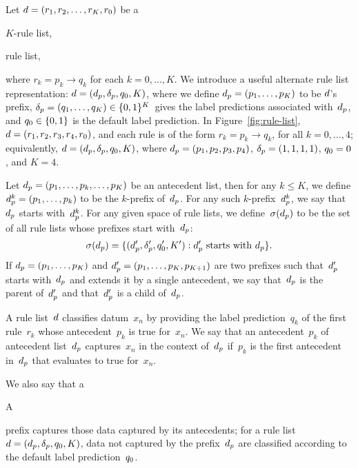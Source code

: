 Let ${{d} = (r_1, r_2, \dots, r_K, r_0)}$ be a
\begin{arxiv}
$K$-rule list,
\end{arxiv}
\begin{kdd}
rule list,
\end{kdd}
where ${r_k = p_k \rightarrow q_k}$ for each ${k = 0, \dots, K}$.
%
We introduce a useful alternate rule list representation:
${{d} = (d_p, \delta_p, q_0, K)}$,
where we define ${d_p = (p_1, \dots, p_K)}$ to be ${d}$'s prefix,
${\delta_p = (q_1, \dots, q_K) \in \{0, 1\}^K}$~gives
the label predictions associated with~$d_p$,
and ${q_0 \in \{0, 1\}}$ is the default label prediction.
%
In Figure~\ref{fig:rule-list}, ${{d} = (r_1, r_2, r_3, r_4, r_0)}$,
and each rule is of the form ${r_k = p_k \rightarrow q_k}$,
for all ${k = 0, \dots, 4}$;
equivalently, ${{d} = (d_p, \delta_p, q_0, K)}$,
where ${d_p = (p_1, p_2, p_3, p_4)}$, ${\delta_p = (1, 1, 1, 1)}$,
${q_0 = 0}$, and ${K=4}$.

Let ${d_p = (p_1, \dots, p_k, \dots, p_K)}$ be an antecedent list,
then for any ${k \le K}$, we define ${d_p^k = (p_1, \dots, p_k)}$
to be the $k$-prefix of~$d_p$.
%
For any such $k$-prefix~$d_p^k$,
we say that~$d_p$ starts with~$d_p^k$.
%
For any given space of rule lists,
we define~$\sigma(d_p)$ to be the set of
all rule lists whose prefixes start with~$d_p$:
\begin{align}
\sigma(d_p) =
\{(d_p', \delta_p', q_0', K') : d_p' \textnormal{ starts with } d_p \}.
\label{eq:starts-with}
\end{align}
%
If ${d_p = (p_1, \dots, p_K)}$ and ${d_p' = (p_1, \dots, p_K, p_{K+1})}$
are two prefixes such that~$d_p'$ starts with~$d_p$ and extends it by
a single antecedent, we say that~$d_p$ is the parent of~$d_p'$
and that~$d_p'$ is a child of~$d_p$.

A rule list~${d}$ classifies datum~$x_n$ by providing the label prediction~$q_k$
of the first rule~$r_k$ whose antecedent~$p_k$ is true for~$x_n$.
%
We say that an antecedent~$p_k$ of antecedent list~$d_p$ captures~$x_n$
in the context of~$d_p$ if~$p_k$ is the first antecedent in~$d_p$ that
evaluates to true for~$x_n$.
%
\begin{arxiv}
We also say that a
\end{arxiv}
\begin{kdd}
A
\end{kdd}
prefix captures those data captured by its antecedents;
for a rule list~${{d} = (d_p, \delta_p, q_0, K)}$,
data not captured by the prefix~$d_p$
are classified according to the default label prediction~$q_0$.

